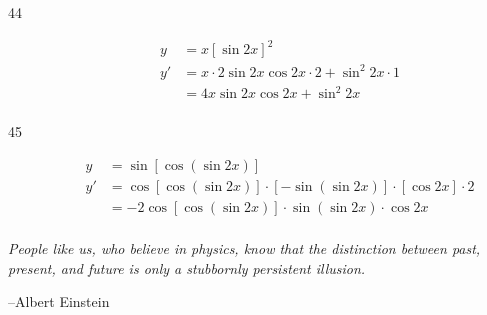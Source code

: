 \documentclass{exam}
\begin{document}
\begin{description}
\item[44]
\begin{align*}
  y  &= x [\sin 2x ]^2 \\
  y' &= x \cdot 2 \sin 2x \cos 2x \cdot 2 + \sin^2 2x \cdot 1 \\
     &= 4x \sin 2x \cos 2x + \sin^2 2x \\
\end{align*}

\item[45]
\begin{align*}
  y  &= \sin [ \cos ( \sin 2x ) ] \\
  y' &= \cos [ \cos ( \sin 2x ) ] \cdot [-\sin ( \sin 2x ) ] \cdot [ \cos 2x ] \cdot 2 \\
     &= -2 \cos [ \cos ( \sin 2x ) ] \cdot \sin ( \sin 2x ) \cdot \cos 2x \\
\end{align*}



\end{description}

\else

\vspace{10 cm}

{\em People like us, who believe in physics, know that the distinction between past, present, and future is only a
  stubbornly persistent illusion.}

\vspace{.2 cm}

\hspace{1 cm} --Albert Einstein


\fi
\end{document}
